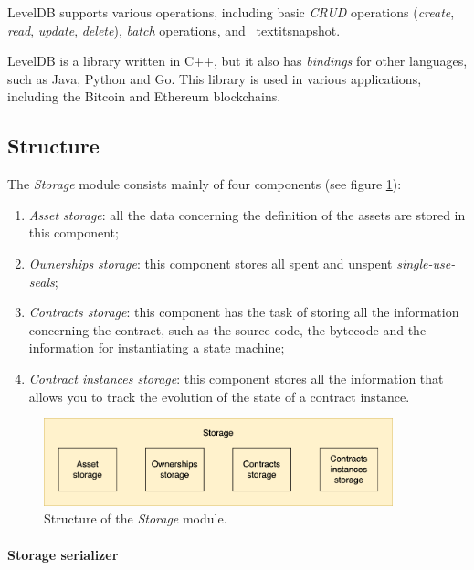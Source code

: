 LevelDB supports various operations, including basic \textit{CRUD} operations (\textit{create}, 
\textit{read}, \textit{update}, \textit{delete}), \textit{batch} operations, and \ textit{snapshot}.

LevelDB is a library written in C++, but it also has \textit{bindings} for other languages, such as Java, 
Python and Go. This library is used in various applications, including the Bitcoin and Ethereum 
blockchains.

\subsection{Structure}

The \textit{Storage} module consists mainly of four components (see figure \ref{fig:storage-structure}):
\begin{enumerate}
  \item \textit{Asset storage}: all the data concerning the definition of the assets are stored in this 
  component;
  \item \textit{Ownerships storage}: this component stores all spent and unspent \textit{single-use-seals};
  \item \textit{Contracts storage}: this component has the task of storing all the information concerning 
  the contract, such as the source code, the bytecode and the information for instantiating a state 
  machine;
  \item \textit{Contract instances storage}: this component stores all the information that allows you to 
  track the evolution of the state of a contract instance.
\end{enumerate}

\begin{figure}[htbp]
	\begin{center}
		\includegraphics[width=0.9\textwidth]{immagini/capitolo-5/storage.png}
		\caption{Structure of the \textit{Storage} module.}
		\label{fig:storage-structure}
	\end{center}
\end{figure}

\paragraph{Storage serializer}

